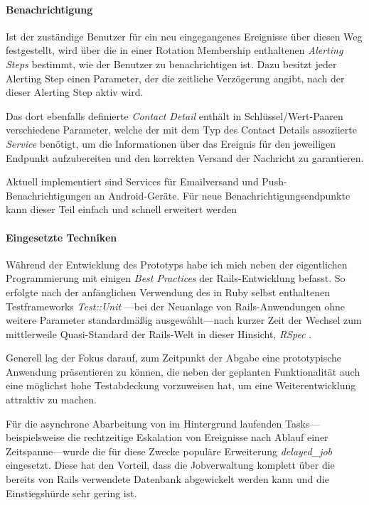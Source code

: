 \documentclass[11pt,utf8,notoc,bibnum,german,final]{zihpub}
\begin{document}
\paragraph{Benachrichtigung}

Ist der zuständige Benutzer für ein neu eingegangenes Ereignisse über diesen
Weg festgestellt, wird über die in einer Rotation Membership enthaltenen
\emph{Alerting Steps} bestimmt, wie der Benutzer zu benachrichtigen ist. Dazu
besitzt jeder Alerting Step einen Parameter, der die zeitliche Verzögerung
angibt, nach der dieser Alerting Step aktiv wird.

Das dort ebenfalls definierte \emph{Contact Detail} enthält in
Schlüssel/Wert-Paaren verschiedene Parameter, welche der mit dem Typ des
Contact Details assoziierte \emph{Service} benötigt, um die Informationen über
das Ereignis für den jeweiligen Endpunkt aufzubereiten und den korrekten
Versand der Nachricht zu garantieren.

Aktuell implementiert sind Services für Emailversand und
Push-Benachrichtigungen an Android-Geräte. Für neue Benachrichtigungsendpunkte
kann dieser Teil einfach und schnell erweitert werden


\paragraph{Eingesetzte Techniken}

Während der Entwicklung des Prototyps habe ich mich neben der eigentlichen
Programmierung mit einigen \emph{Best Practices} der Rails-Entwicklung befasst.
So erfolgte nach der anfänglichen Verwendung des in Ruby selbst enthaltenen
Testframeworks \emph{Test::Unit} \cite{testunit}—bei der Neuanlage von
Rails-Anwendungen ohne weitere Parameter standardmäßig ausgewählt—nach kurzer
Zeit der Wechsel zum mittlerweile Quasi-Standard der Rails-Welt in dieser
Hinsicht, \emph{RSpec} \cite{rspec}.


Generell lag der Fokus darauf, zum Zeitpunkt der Abgabe eine prototypische
Anwendung präsentieren zu können, die neben der geplanten Funktionalität auch
eine möglichst hohe Testabdeckung vorzuweisen hat, um eine Weiterentwicklung
attraktiv zu machen.

Für die asynchrone Abarbeitung von im Hintergrund laufenden
Tasks—beispielsweise die rechtzeitige Eskalation von Ereignisse nach Ablauf
einer Zeitspanne—wurde die für diese Zwecke populäre Erweiterung
\emph{delayed\_job} \cite{delayedjob} eingesetzt. Diese hat den Vorteil, dass
die Jobverwaltung komplett über die bereits von Rails verwendete Datenbank
abgewickelt werden kann und die Einstiegshürde sehr gering ist.
\end{document}

